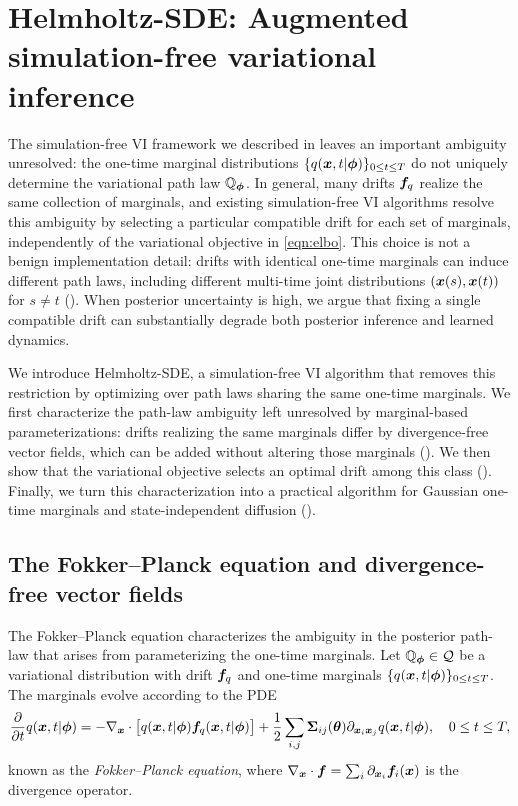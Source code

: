 \section{Helmholtz-SDE: Augmented simulation-free variational inference}\label{sec:method}

The simulation-free VI framework we described in  leaves an important ambiguity unresolved: the one-time marginal distributions $\{q(\boldsymbol{x},t|\boldsymbol{\phi})\}_{0 \leq t \leq T}$ do not uniquely determine the variational path law $\mathbb{Q}_{\boldsymbol{\phi}}$. 
In general, many drifts $\boldsymbol{f}_q$ realize the same collection of marginals, and existing simulation-free VI algorithms resolve this ambiguity by selecting a particular compatible drift for each set of marginals, independently of the variational objective in \cref{eqn:elbo}. 
This choice is not a benign implementation detail: drifts with identical one-time marginals can induce different path laws, including different multi-time joint distributions $(\boldsymbol{x}(s), \boldsymbol{x}(t))$ for $s \neq t$ (). 
When posterior uncertainty is high, we argue that fixing a single compatible drift can substantially degrade both posterior inference and learned dynamics.

We introduce Helmholtz-SDE, a simulation-free VI algorithm that removes this restriction by optimizing over path laws sharing the same one-time marginals. 
We first characterize the path-law ambiguity left unresolved by marginal-based parameterizations: drifts realizing the same marginals differ by divergence-free vector fields, which can be added without altering those marginals (). 
We then show that the variational objective selects an optimal drift among this class ().
Finally, we turn this characterization into a practical algorithm for Gaussian one-time marginals and state-independent diffusion ().


\subsection{The Fokker--Planck equation and divergence-free vector fields}\label{subsec:fpk}
The Fokker--Planck equation characterizes the ambiguity in the posterior path-law that arises from parameterizing the one-time marginals. 
Let $\mathbb{Q}_{\boldsymbol{\phi}} \in \mathcal{Q}$ be a variational distribution with drift $\boldsymbol{f}_q$ and one-time marginals $\{q(\boldsymbol{x},t | \boldsymbol{\phi})\}_{0 \le t \le T}$. The marginals evolve according to the PDE
\begin{equation}\label{eqn:fpk}
    \frac{\partial}{\partial t} q(\boldsymbol{x}, t | \boldsymbol{\phi}) = - \nabla_{\boldsymbol{x}} \cdot \bigl[q(\boldsymbol{x},t | \boldsymbol{\phi})\boldsymbol{f}_q(\boldsymbol{x},t | \boldsymbol{\phi})\bigr] + \frac{1}{2}\sum_{i,j} \boldsymbol{\Sigma}_{ij}(\boldsymbol{\theta}) \partial_{\boldsymbol{x}_i \boldsymbol{x}_j} q(\boldsymbol{x},t | \boldsymbol{\phi}), \quad 0 \le t \le T,
\end{equation}
known as the \emph{Fokker--Planck equation}, where $\nabla_{\boldsymbol{x}} \cdot \boldsymbol{f} = \sum_i \partial_{\boldsymbol{x}_i} \boldsymbol{f}_i(\boldsymbol{x})$ is the divergence operator.

